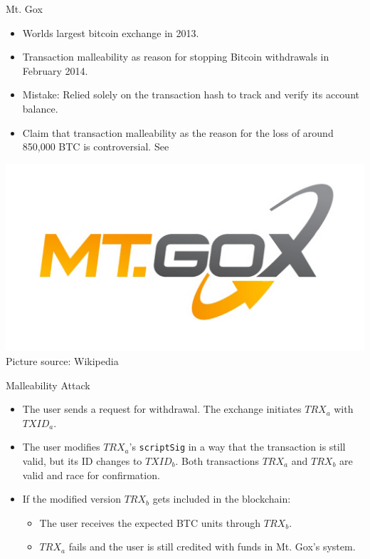 \documentclass[handout]{beamer}
\begin{document}
\begin{frame}{Mt. Gox}
	\centering
		\begin{itemize}
			\item Worlds largest bitcoin exchange in 2013.
			\item Transaction malleability as reason for stopping Bitcoin withdrawals in February 2014.
			\item Mistake: Relied solely on the transaction hash to track and verify its account balance.
			\item Claim that transaction malleability as the reason for the loss of around 850,000 BTC is controversial. See \cite{Decker2014}
		\end{itemize}
	\includegraphics[scale=0.12]{../assets/images/mt_gox}\\
	\footnotesize{Picture source: Wikipedia}	
\end{frame}


\begin{frame}{Malleability Attack}
	\centering
	\begin{tikzpicture}[squarednode/.style = {rectangle, draw=black!60, fill=black!5}]
		
	\end{tikzpicture}
	\begin{itemize}	
		\item<3->[1.] The user sends a request for withdrawal. The exchange initiates $TRX_a$ with $TXID_a$.
		\item<4->[2.] The user modifies $TRX_a$'s \texttt{scriptSig} in a way that the transaction is still valid, but its ID changes to $TXID_b$. Both transactions $TRX_a$ and $TRX_b$ are valid and race for confirmation.
		\item<5->[3.] If the modified version $TRX_b$ gets included in the blockchain:
		\begin{itemize}
			\item The user receives the expected BTC units through $TRX_b$.
			\item $TRX_a$ fails and the user is still credited with funds in Mt. Gox's system.
		\end{itemize}
	\end{itemize}
\end{frame}
\end{document}
